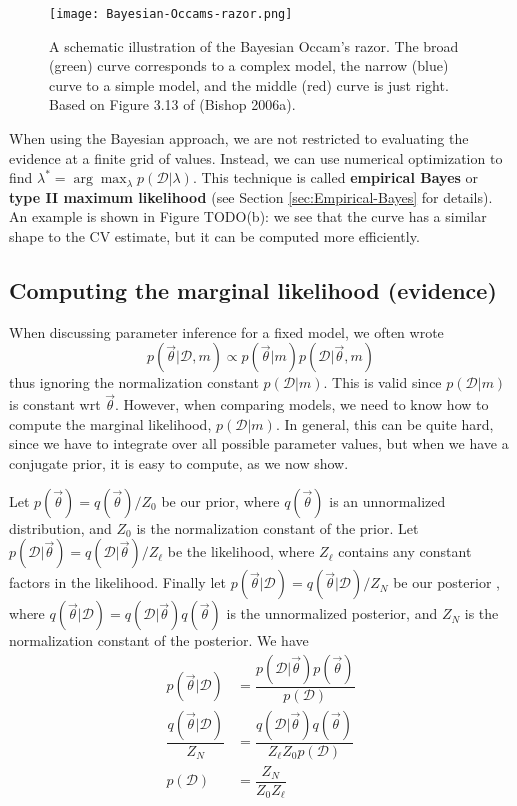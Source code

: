 \begin{figure}[hbtp]
\centering
    \texttt{[image: Bayesian-Occams-razor.png]}
\caption{A schematic illustration of the Bayesian Occam’s razor. The broad (green) curve corresponds to a complex model, the narrow (blue) curve to a simple model, and the middle (red) curve is just right. Based on Figure 3.13 of (Bishop 2006a). }
\label{fig:Bayesian-Occams-razor} 
\end{figure}

When using the Bayesian approach, we are not restricted to evaluating the evidence at a finite grid of values. Instead, we can use numerical optimization to find $\lambda^*=\arg\max_{\lambda}p(\mathcal{D}|\lambda)$. This technique is called \textbf{empirical Bayes} or \textbf{type II maximum likelihood} (see Section \ref{sec:Empirical-Bayes} for details). An example is shown in Figure TODO(b): we see that the curve has a similar shape to the CV estimate, but it can be computed more efficiently.


\subsection{Computing the marginal likelihood (evidence)}
\label{sec:Computing-the-marginal-likelihood}
When discussing parameter inference for a fixed model, we often wrote
\begin{equation}
p(\vec{\theta}|\mathcal{D},m) \propto p(\vec{\theta}|m)p(\mathcal{D}|\vec{\theta},m)
\end{equation}
thus ignoring the normalization constant $p(\mathcal{D}|m)$. This is valid since $p(\mathcal{D}|m)$is constant wrt $\vec{\theta}$. However, when comparing models, we need to know how to compute the marginal likelihood, $p(\mathcal{D}|m)$. In general, this can be quite hard, since we have to integrate over all possible parameter values, but when we have a conjugate prior, it is easy to compute, as we now show.

Let $p(\vec{\theta})=q(\vec{\theta})/Z_0$ be our prior, where $q(\vec{\theta})$ is an unnormalized distribution, and $Z_0$ is the normalization constant of the prior. Let $p(\mathcal{D}|\vec{\theta})=q(\mathcal{D}|\vec{\theta})/Z_{\ell}$ be the likelihood, where $Z_{\ell}$ contains any constant factors in the likelihood. Finally let $p(\vec{\theta}|\mathcal{D})=q(\vec{\theta}|\mathcal{D})/Z_N$ be our posterior , where $q(\vec{\theta}|\mathcal{D})=q(\mathcal{D}|\vec{\theta})q(\vec{\theta})$ is the unnormalized posterior, and $Z_N$ is the normalization constant of the posterior. We have
\begin{align}
p(\vec{\theta}|\mathcal{D})& =\dfrac{p(\mathcal{D}|\vec{\theta})p(\vec{\theta})}{p(\mathcal{D})} \\
\dfrac{q(\vec{\theta}|\mathcal{D})}{Z_N}& =\dfrac{q(\mathcal{D}|\vec{\theta})q(\vec{\theta})}{Z_{\ell}Z_0p(\mathcal{D})} \\
p(\mathcal{D})& = \dfrac{Z_N}{Z_0Z_{\ell}}
\end{align}

